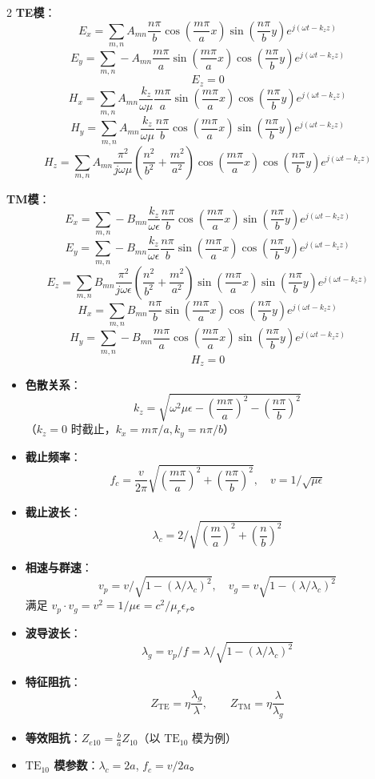 \documentclass[10pt,a4paper,landscape]{article}
\begin{document}
\begin{multicols}{2}
\textbf{TE模}：
\[
E_x = \sum_{m,n} A_{mn}\frac{n\pi}{b}\cos\left(\frac{m\pi}{a}x\right)\sin\left(\frac{n\pi}{b}y\right)e^{j(\omega t - k_z z)}
\]
\[
E_y = \sum_{m,n} -A_{mn}\frac{m\pi}{a}\sin\left(\frac{m\pi}{a}x\right)\cos\left(\frac{n\pi}{b}y\right)e^{j(\omega t - k_z z)}
\]
\[
E_z = 0
\]
\[
H_x = \sum_{m,n} A_{mn}\frac{k_z}{\omega\mu}\frac{m\pi}{a}\sin\left(\frac{m\pi}{a}x\right)\cos\left(\frac{n\pi}{b}y\right)e^{j(\omega t - k_z z)}
\]
\[
H_y = \sum_{m,n} A_{mn}\frac{k_z}{\omega\mu}\frac{n\pi}{b}\cos\left(\frac{m\pi}{a}x\right)\sin\left(\frac{n\pi}{b}y\right)e^{j(\omega t - k_z z)}
\]
\[
H_z = \sum_{m,n} A_{mn}\frac{\pi^2}{j\omega\mu}\left(\frac{n^2}{b^2} + \frac{m^2}{a^2}\right)\cos\left(\frac{m\pi}{a}x\right)\cos\left(\frac{n\pi}{b}y\right)e^{j(\omega t - k_z z)}
\]

\textbf{TM模}：
\[
E_x = \sum_{m,n} -B_{mn}\frac{k_z}{\omega\epsilon}\frac{n\pi}{b}\cos\left(\frac{m\pi}{a}x\right)\sin\left(\frac{n\pi}{b}y\right)e^{j(\omega t - k_z z)}
\]
\[
E_y = \sum_{m,n} -B_{mn}\frac{k_z}{\omega\epsilon}\frac{n\pi}{b}\sin\left(\frac{m\pi}{a}x\right)\cos\left(\frac{n\pi}{b}y\right)e^{j(\omega t - k_z z)}
\]
\[
E_z = \sum_{m,n} B_{mn}\frac{\pi^2}{j\omega\epsilon}\left(\frac{n^2}{b^2} + \frac{m^2}{a^2}\right)\sin\left(\frac{m\pi}{a}x\right)\sin\left(\frac{n\pi}{b}y\right)e^{j(\omega t - k_z z)}
\]
\[
H_x = \sum_{m,n} B_{mn}\frac{n\pi}{b}\sin\left(\frac{m\pi}{a}x\right)\cos\left(\frac{n\pi}{b}y\right)e^{j(\omega t - k_z z)}
\]
\[
H_y = \sum_{m,n} -B_{mn}\frac{m\pi}{a}\cos\left(\frac{m\pi}{a}x\right)\sin\left(\frac{n\pi}{b}y\right)e^{j(\omega t - k_z z)}
\]
\[
H_z = 0
\]

\begin{itemize}
    \item \textbf{色散关系}：
    \[
    k_z = \sqrt{\omega^2\mu\epsilon - \left(\frac{m\pi}{a}\right)^2 - \left(\frac{n\pi}{b}\right)^2}
    \]
    （$k_z=0$ 时截止，$k_x = m\pi/a, k_y = n\pi/b$）
    \item \textbf{截止频率}：
    \[
    f_c = \frac{v}{2\pi}\sqrt{\left(\frac{m\pi}{a}\right)^2 + \left(\frac{n\pi}{b}\right)^2}, \quad v = 1/\sqrt{\mu\epsilon}
    \]
    \item \textbf{截止波长}：
    \[
    \lambda_c = 2 / \sqrt{\left(\frac{m}{a}\right)^2 + \left(\frac{n}{b}\right)^2}
    \]
    \item \textbf{相速与群速}：
    \[
    v_p = v/\sqrt{1-(\lambda/\lambda_c)^2}, \quad v_g = v\sqrt{1-(\lambda/\lambda_c)^2}
    \]
    满足 $v_p \cdot v_g = v^2 = 1/\mu\epsilon = c^2/\mu_r\epsilon_r$。
    \item \textbf{波导波长}：
    \[
    \lambda_g = v_p/f = \lambda / \sqrt{1-(\lambda/\lambda_c)^2}
    \]
    \item \textbf{特征阻抗}：
    \[
    Z_{\text{TE}} = \eta \frac{\lambda_g}{\lambda}, \qquad Z_{\text{TM}} = \eta \frac{\lambda}{\lambda_g}
    \]
    \item \textbf{等效阻抗}：$Z_{e10} = \frac{b}{a}Z_{10}$（以 $\text{TE}_{10}$ 模为例）
    \item \textbf{$\text{TE}_{10}$ 模参数}：$\lambda_c = 2a$, $f_c = v/2a$。
\end{itemize}


\end{multicols}
\end{document}
